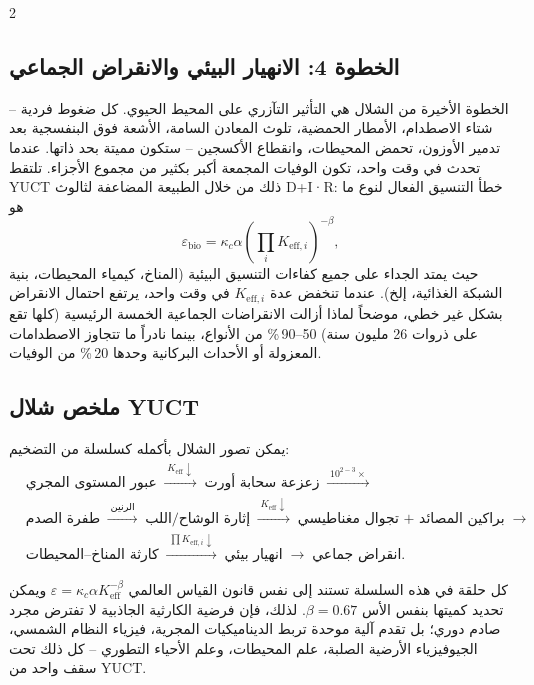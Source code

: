 \documentclass[11pt,a4paper]{article}
\begin{document}
\begin{multicols}{2}
		\subsection{الخطوة 4: الانهيار البيئي والانقراض الجماعي}
		الخطوة الأخيرة من الشلال هي التأثير التآزري على المحيط الحيوي. كل ضغوط فردية – شتاء الاصطدام، الأمطار الحمضية، تلوث المعادن السامة، الأشعة فوق البنفسجية بعد تدمير الأوزون، تحمض المحيطات، وانقطاع الأكسجين – ستكون مميتة بحد ذاتها. عندما تحدث في وقت واحد، تكون الوفيات المجمعة أكبر بكثير من مجموع الأجزاء. تلتقط YUCT ذلك من خلال الطبيعة المضاعفة لثالوث D+I·R: خطأ التنسيق الفعال لنوع ما هو
		\[
		\varepsilon_{\text{bio}} = \kappa_c \alpha \left( \prod_{i} K_{\mathrm{eff},i} \right)^{-\beta},
		\]
		حيث يمتد الجداء على جميع كفاءات التنسيق البيئية (المناخ، كيمياء المحيطات، بنية الشبكة الغذائية، إلخ). عندما تنخفض عدة \(K_{\mathrm{eff},i}\) في وقت واحد، يرتفع احتمال الانقراض بشكل غير خطي، موضحاً لماذا أزالت الانقراضات الجماعية الخمسة الرئيسية (كلها تقع على ذروات 26 مليون سنة) 50–90 \% من الأنواع، بينما نادراً ما تتجاوز الاصطدامات المعزولة أو الأحداث البركانية وحدها 20 \% من الوفيات.
		
	\end{multicols}
	
	\subsection{ملخص شلال YUCT}
	يمكن تصور الشلال بأكمله كسلسلة من التضخيم:
	{\small
		\[
		\begin{aligned}
			&\text{عبور المستوى المجري}
			\;\xrightarrow{\;K_{\mathrm{eff}}\downarrow\;}\;
			\text{زعزعة سحابة أورت}
			\;\xrightarrow{\;10^{2-3}\times\;}\\
			&\text{طفرة الصدم}
			\;\xrightarrow{\;\text{الرنين}\;}\;
			\text{إثارة الوشاح/اللب}
			\;\xrightarrow{\;K_{\mathrm{eff}}\downarrow\;}\;
			\text{براكين المصائد + تجوال مغناطيسي}
			\;\xrightarrow{\;}\\
			&\text{كارثة المناخ–المحيطات}
			\;\xrightarrow{\;\prod K_{\mathrm{eff},i}\downarrow\;}\;
			\text{انهيار بيئي}
			\;\xrightarrow{\;}\;
			\text{انقراض جماعي}.
		\end{aligned}
		\]
	}
	
	كل حلقة في هذه السلسلة تستند إلى نفس قانون القياس العالمي \(\varepsilon = \kappa_c \alpha K_{\mathrm{eff}}^{-\beta}\) ويمكن تحديد كميتها بنفس الأس \(\beta = 0.67\). لذلك، فإن فرضية الكارثية الجاذبية لا تفترض مجرد صادم دوري؛ بل تقدم آلية موحدة تربط الديناميكيات المجرية، فيزياء النظام الشمسي، الجيوفيزياء الأرضية الصلبة، علم المحيطات، وعلم الأحياء التطوري – كل ذلك تحت سقف واحد من YUCT.
	
\end{document}
